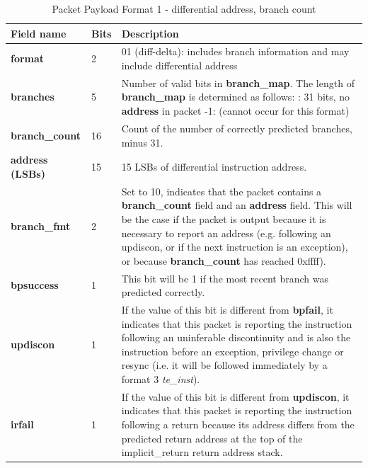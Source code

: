 \begin{table}[htp]
  \centering
  \caption{Packet Payload Format 1 - differential address, branch count}
  \label{tab:te_inst0-1-addr-count}
  \begin{tabulary}{\textwidth}{|l|p{35mm}|p{80mm}|}
    \hline
    {\bf Field name} & {\bf Bits} & {\bf Description} \\
    \hline
    \textbf{format}	& 2	& 01 (diff-delta): includes branch information and may include differential address\\
    \hline
    \textbf{branches} & 5 & Number of valid bits in \textbf{branch\_map}. The length of \textbf{branch\_map} is determined as follows: :    31 bits, no \textbf{address} in packet -1: (cannot occur for this format) \\
    \hline
    \textbf{branch\_count} & 16 & Count of the number of correctly predicted branches, minus 31. \\
    \hline
    \textbf{address (LSBs)}	& 15 & 
                15 LSBs of differential instruction address.\\
    \textbf{branch\_fmt} & 2 & Set to 10, indicates that the packet contains a \textbf{branch\_count} field and
     an \textbf{address} field. This will be the case if the packet is output because it is necessary to report an
     address (e.g. following an updiscon, or if the next instruction is an exception), or because \textbf{branch\_count} 
     has reached 0xffff).\\
    \hline
    \textbf{bpsuccess} & 1 & This bit will be 1 if the most recent branch was predicted correctly. \\
    \hline
    \textbf{updiscon}	& 1 & 
                If the value of this bit is different from \textbf{bpfail}, it indicates that this 
                packet is reporting the instruction following an uninferable discontinuity and is also the 
                instruction before an exception, privilege change or resync 
                (i.e. it will be followed immediately by a format 3 \textit{te\_inst}).\\
    \hline
    \textbf{irfail}	& 1 & 
                If the value of this bit is different from \textbf{updiscon}, it indicates that this
                packet is reporting the instruction following a return because its address differs from 
                the predicted return address at the top of the implicit\_return return address stack.\\

\end{tabulary}
\end{table}
